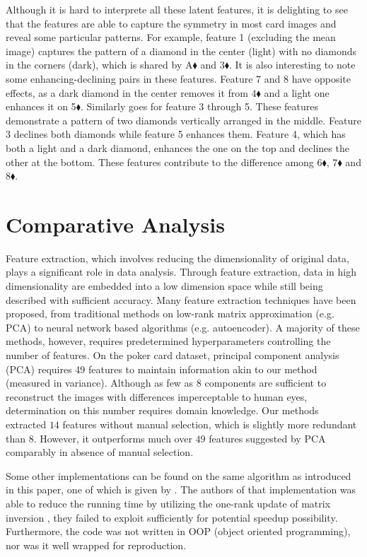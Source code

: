 \documentclass{article}
\begin{document}
Although it is hard to interprete all these latent features, it is delighting to see that the features are able to capture the symmetry in most card images and reveal some particular patterns. For example, feature 1 (excluding the mean image) captures the pattern of a diamond in the center (light) with no diamonds in the corners (dark), which is shared by A$\blacklozenge$ and 3$\blacklozenge$. It is also interesting to note some enhancing-declining pairs in these features. Feature 7 and 8 have opposite effects, as a dark diamond in the center removes it from 4$\blacklozenge$ and a light one enhances it on 5$\blacklozenge$. Similarly goes for feature 3 through 5. These features demonstrate a pattern of two diamonds vertically arranged in the middle. Feature 3 declines both diamonds while feature 5 enhances them. Feature 4, which has both a light and a dark diamond, enhances the one on the top and declines the other at the bottom. These features contribute to the difference among 6$\blacklozenge$, 7$\blacklozenge$ and 8$\blacklozenge$.



\section{Comparative Analysis}\label{sec::comparison}
Feature extraction, which involves reducing the dimensionality of original data, plays a significant role in data analysis. Through feature extraction, data in high dimensionality are embedded into a low dimension space while still being described with sufficient accuracy. Many feature extraction techniques have been proposed, from traditional methods on low-rank matrix approximation (e.g. PCA) to neural network based algorithms (e.g. autoencoder). A majority of these methods, however, requires predetermined hyperparameters controlling the number of features. On the poker card dataset, principal component analysis (PCA) requires 49 features to maintain information akin to our method (measured in variance). Although as few as $8$ components are sufficient to reconstruct the images with differences imperceptable to human eyes, determination on this number requires domain knowledge. Our methods extracted $14$ features without manual selection, which is slightly more redundant than $8$. However, it outperforms much over $49$ features suggested by PCA comparably in absence of manual selection.

Some other implementations can be found on the same algorithm as introduced in this paper, one of which is given by \citet{chai}. The authors of that implementation was able to reduce the running time by utilizing the one-rank update of matrix inversion \citep{griffiths2005infinite}, they failed to exploit sufficiently for potential speedup possibility. Furthermore, the code was not written in OOP (object oriented programming), nor was it well wrapped for reproduction.
\end{document}
